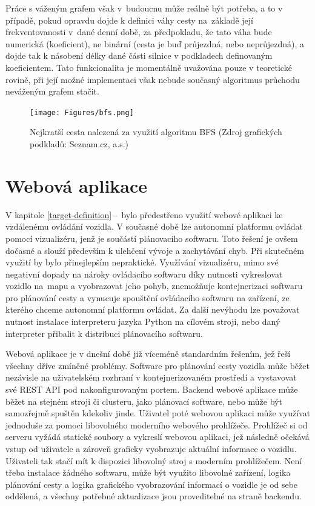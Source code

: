 \documentclass[czech, bachelor]{diploma}
\newcommand{\filipref}[1]{\ref{#1}\,--\,\nameref{#1}}
\begin{document}
Práce s váženým grafem však v~budoucnu může reálně být potřeba, a to v případě, pokud opravdu dojde k definici váhy cesty
na~základě její frekventovanosti v~dané denní době, za předpokladu, že tato váha bude numerická (koeficient), ne binární 
(cesta je buď průjezdná, nebo neprůjezdná), a dojde tak k násobení délky dané části silnice v podkladech definovaným koeficientem.
Tato funkcionalita je momentálně uvažována pouze v teoretické rovině, při její možné implementaci však nebude současný algoritmus
průchodu neváženým grafem stačit.

\begin{figure}
    \centering
    \texttt{[image: Figures/bfs.png]}
    \caption{Nejkratší cesta nalezená za využití algoritmu BFS (Zdroj grafických podkladů: Seznam.cz, a.s.)}
    \label{fig:bfs}
\end{figure}

\chapter{Webová aplikace} \label{web-app}

V kapitole \filipref{target-definition} bylo předestřeno využití webové aplikaci ke vzdálenému ovládání vozidla. V současné době
lze autonomní platformu ovládat pomocí vizualizéru, jenž je součástí plánovacího softwaru. Toto řešení je ovšem dočasné a slouží
především k ulehčení vývoje a zachytávání chyb. Při skutečném využití by bylo přinejlepším nepraktické. Využívání vizualizéru,
mimo své negativní dopady na nároky ovládacího softwaru díky nutnosti vykreslovat vozidlo na~mapu a vyobrazovat jeho pohyb,
znemožňuje kontejnerizaci softwaru pro plánování cesty a vynucuje spouštění ovládacího softwaru na zařízení, ze kterého chceme
autonomní platformu ovládat. Za další nevýhodu lze považovat nutnost instalace interpreteru jazyka Python na cílovém stroji, nebo
daný interpreter přibalit k distribuci plánovacího softwaru.

Webová aplikace je v dnešní době již víceméně standardním řešením, jež řeší všechny dříve zmíněné problémy. Software pro plánování
cesty vozidla může běžet nezávisle na uživatelském rozhraní v kontejnerizovaném prostředí a vystavovat své REST API
pod nakonfigurovaným portem. Backend webové aplikace může běžet na stejném stroji či clusteru, jako plánovací software, nebo může
být samozřejmě spuštěn kdekoliv jinde. Uživatel poté webovou aplikaci může využívat jednoduše za pomoci libovolného moderního
webového prohlížeče. Prohlížeč si od serveru vyžádá statické soubory a vykreslí webovou aplikaci, jež následně očekává vstup
od uživatele a zároveň graficky vyobrazuje aktuální informace o vozidlu. Uživateli tak stačí mít k dispozici libovolný stroj
s moderním prohlížečem. Není třeba instalace žádného softwaru, může být využito libovolné zařízení, logika plánování cesty
a logika grafického vyobrazování informací o vozidle je od sebe oddělená, a všechny potřebné aktualizace jsou proveditelné
na straně backendu.
\end{document}
